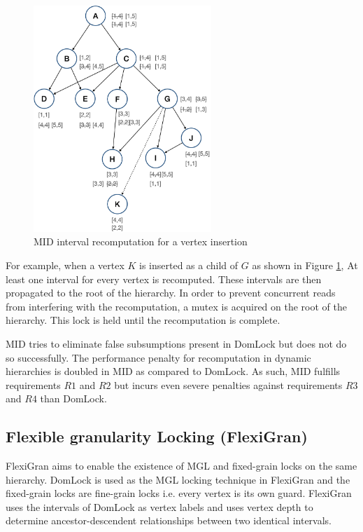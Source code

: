 \begin{figure}[H]
    \centering
    \captionsetup{justification=centering}
    \includegraphics[width=0.6\textwidth]{figures/MID_example_with_SM.png}
    \caption{MID interval recomputation for a vertex insertion}
    \label{fig:MID_example_SM}
    
\end{figure}

For example, when a vertex $K$ is inserted as a child of $G$ as shown in Figure \ref{fig:MID_example_SM}, At least one interval for every vertex is recomputed. These intervals are then propagated to the root of the hierarchy. In order to prevent concurrent reads from interfering with the recomputation, a mutex is acquired on the root of the hierarchy. This lock is held until the recomputation is complete.

MID tries to eliminate false subsumptions present in DomLock but does not do so successfully. The performance penalty for recomputation in dynamic hierarchies is doubled in MID as compared to DomLock. As such, MID fulfills requirements $R1$ and $R2$ but incurs even severe penalties against requirements $R3$ and $R4$ than DomLock.

\subsection{Flexible granularity Locking (FlexiGran)}

FlexiGran \cite{FlexiGran2024} aims to enable the existence of MGL and fixed-grain locks on the same hierarchy. 
DomLock is used as the MGL locking technique in FlexiGran and the fixed-grain locks are fine-grain locks i.e. every vertex is its own guard. 
FlexiGran uses the intervals of DomLock  as vertex labels and uses vertex depth to determine ancestor-descendent relationships between two identical intervals.

